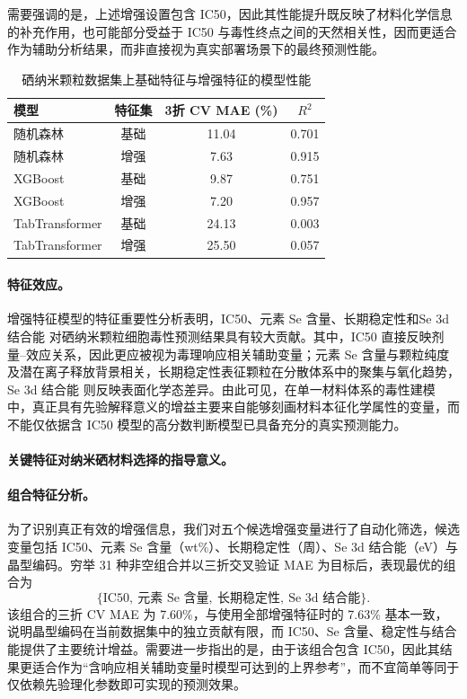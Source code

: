 需要强调的是，上述增强设置包含 IC50，因此其性能提升既反映了材料化学信息的补充作用，也可能部分受益于 IC50 与毒性终点之间的天然相关性，因而更适合作为辅助分析结果，而非直接视为真实部署场景下的最终预测性能。

\begin{table}[htbp]
  \centering
  \caption{硒纳米颗粒数据集上基础特征与增强特征的模型性能}
  \label{tab:senp_main_results}
  \begin{tabular}{lccc}
    \hline
    模型 & 特征集 & 3折 CV MAE (\%) & $R^2$ \\
    \hline
    随机森林 & 基础 & 11.04 & 0.701 \\
    随机森林 & 增强 & 7.63 & 0.915 \\
    XGBoost & 基础 & 9.87 & 0.751 \\
    XGBoost & 增强 & 7.20 & 0.957 \\
    TabTransformer & 基础 & 24.13 & 0.003 \\
    TabTransformer & 增强 & 25.50 & 0.057 \\
    \hline
  \end{tabular}
\end{table}

\paragraph{特征效应。}
增强特征模型的特征重要性分析表明，IC50、元素 Se 含量、长期稳定性和Se 3d 结合能 对硒纳米颗粒细胞毒性预测结果具有较大贡献。其中，IC50 直接反映剂量--效应关系，因此更应被视为毒理响应相关辅助变量；元素 Se 含量与颗粒纯度及潜在离子释放背景相关，长期稳定性表征颗粒在分散体系中的聚集与氧化趋势，Se 3d 结合能 则反映表面化学态差异。由此可见，在单一材料体系的毒性建模中，真正具有先验解释意义的增益主要来自能够刻画材料本征化学属性的变量，而不能仅依据含 IC50 模型的高分数判断模型已具备充分的真实预测能力。

\paragraph{关键特征对纳米硒材料选择的指导意义。}

\paragraph{组合特征分析。}
为了识别真正有效的增强信息，我们对五个候选增强变量进行了自动化筛选，候选变量包括 IC50、元素 Se 含量（wt\%）、长期稳定性（周）、Se 3d 结合能（eV）与晶型编码。穷举 31 种非空组合并以三折交叉验证 MAE 为目标后，表现最优的组合为
\[
\{\text{IC50},\ \text{元素 Se 含量},\ \text{长期稳定性},\ \text{Se 3d 结合能}\}.
\]
该组合的三折 CV MAE 为 7.60\%，与使用全部增强特征时的 7.63\% 基本一致，说明晶型编码在当前数据集中的独立贡献有限，而 IC50、Se 含量、稳定性与结合能提供了主要统计增益。需要进一步指出的是，由于该组合包含 IC50，因此其结果更适合作为“含响应相关辅助变量时模型可达到的上界参考”，而不宜简单等同于仅依赖先验理化参数即可实现的预测效果。

